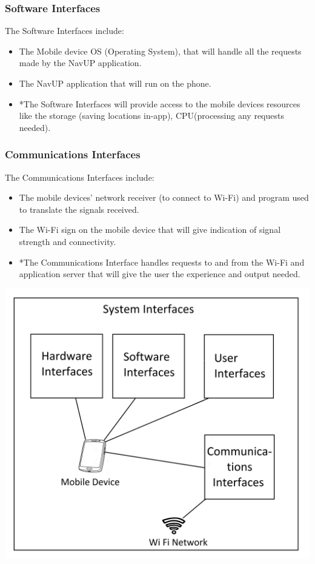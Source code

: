 \documentclass[12pt]{article}
\begin{document}
		\subsubsection{Software Interfaces}
		The Software Interfaces include:
		\begin{itemize}
		\item The Mobile device OS (Operating System), that will handle all the requests made by the NavUP application.
		\item The NavUP application that will run on the phone.
		\item *The Software Interfaces will provide access to the mobile devices resources like the storage (saving locations in-app), CPU(processing any requests needed).
		\end{itemize}
		
		\subsubsection{Communications Interfaces}
		The Communications Interfaces include:
		\begin{itemize}
		\item The mobile devices’ network receiver (to connect to Wi-Fi) and program used to translate the signals received. 
		\item The Wi-Fi sign on the mobile device that will give indication of signal strength and connectivity.
		\item *The Communications Interface handles requests to and from the Wi-Fi and application server that will give the user the experience and output needed.
		\end{itemize}
		
		\begin{center}
		\includegraphics[scale=0.1]{BLockDiagram.jpg}
		\end{center}
		
\end{document}

